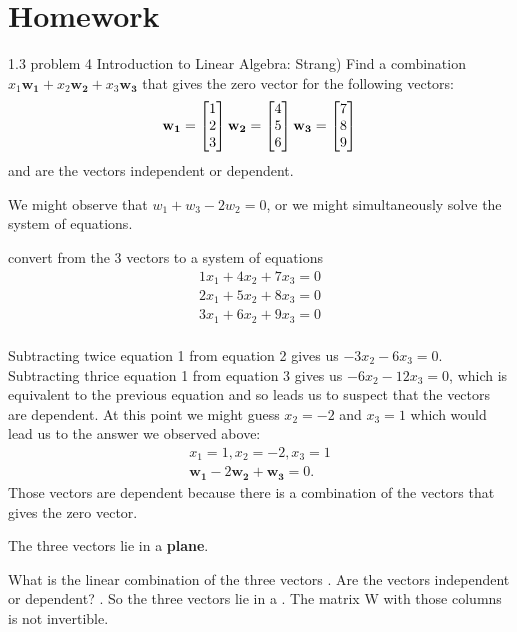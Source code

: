 \documentclass{ximera}
\begin{document}
\section*{Homework}
\begin{question}
1.3 problem 4 Introduction to Linear Algebra: Strang) Find a combination $x_1\mathbf{w_1} + x_2\mathbf{w_2} + x_3\mathbf{w_3}$ that gives the zero vector for the following vectors:
\begin{align*}
\mathbf{w_1} = \begin{bmatrix}1\\2\\3\end{bmatrix} \mathbf{w_2} = \begin{bmatrix}4\\5\\6\end{bmatrix} \mathbf{w_3} = \begin{bmatrix}7\\8\\9\end{bmatrix}
\end{align*}
and are the vectors independent or dependent.
\begin{solution}
\begin{hint}
We might observe that $w_1 + w_3 -2w_2 = 0$, or we might simultaneously solve the system of equations.
\end{hint}
\begin{hint}
convert from the 3 vectors to a system of equations
\begin{align*}
1x_1+4x_2+7x_3=0\\
2x_1+5x_2+8x_3=0\\
3x_1+6x_2+9x_3=0\\
\end{align*}
\end{hint}
\begin{hint}
Subtracting twice equation 1 from equation 2 gives us $-3x_2 - 6x_3 = 0$. Subtracting thrice equation 1 from equation 3 gives us $-6x_2 - 12x_3 = 0$, which is equivalent to the previous equation and so leads us to suspect that the vectors are dependent. At this point we might guess $x_2 = -2$ and $x_3 = 1$ which would lead us to the answer we observed above:
\begin{align*}
x_1 =1, x_2 =-2, x_3 =1\\
\mathbf{w_1}-2\mathbf{w_2}+\mathbf{w_3} =0.
\end{align*}
Those vectors are dependent because there is a combination of the vectors
that gives the zero vector.
\end{hint}
\begin{hint}
The three vectors lie in a \textbf{plane}.
\end{hint}
What is the linear combination of the three vectors .
Are the vectors independent or dependent?  .
So the three vectors lie in a . The matrix W with those columns
is not invertible.
\end{solution}
\end{question}
\end{document}
